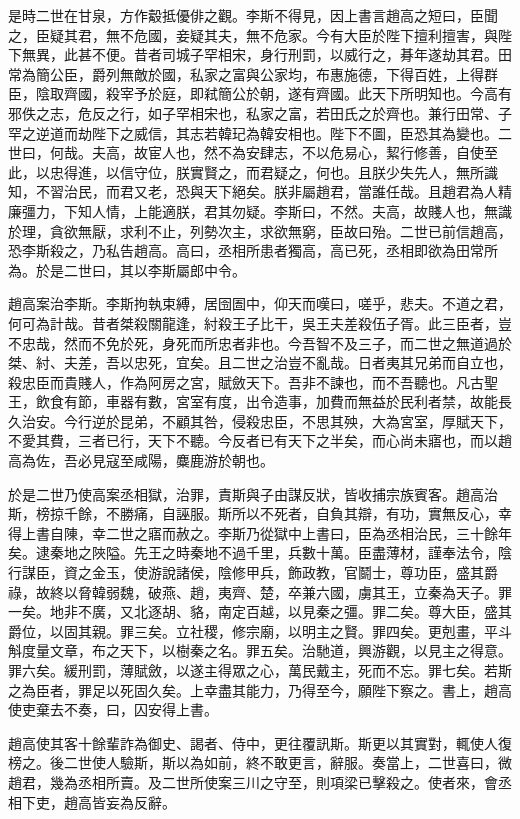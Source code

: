 是時二世在甘泉，方作觳抵優俳之觀。李斯不得見，因上書言趙高之短曰，臣聞之，臣疑其君，無不危國，妾疑其夫，無不危家。今有大臣於陛下擅利擅害，與陛下無異，此甚不便。昔者司城子罕相宋，身行刑罰，以威行之，朞年遂劫其君。田常為簡公臣，爵列無敵於國，私家之富與公家均，布惠施德，下得百姓，上得群臣，陰取齊國，殺宰予於庭，即弒簡公於朝，遂有齊國。此天下所明知也。今高有邪佚之志，危反之行，如子罕相宋也，私家之富，若田氏之於齊也。兼行田常、子罕之逆道而劫陛下之威信，其志若韓玘為韓安相也。陛下不圖，臣恐其為變也。二世曰，何哉。夫高，故宦人也，然不為安肆志，不以危易心，絜行修善，自使至此，以忠得進，以信守位，朕實賢之，而君疑之，何也。且朕少失先人，無所識知，不習治民，而君又老，恐與天下絕矣。朕非屬趙君，當誰任哉。且趙君為人精廉彊力，下知人情，上能適朕，君其勿疑。李斯曰，不然。夫高，故賤人也，無識於理，貪欲無厭，求利不止，列勢次主，求欲無窮，臣故曰殆。二世已前信趙高，恐李斯殺之，乃私告趙高。高曰，丞相所患者獨高，高已死，丞相即欲為田常所為。於是二世曰，其以李斯屬郎中令。

趙高案治李斯。李斯拘執束縛，居囹圄中，仰天而嘆曰，嗟乎，悲夫。不道之君，何可為計哉。昔者桀殺關龍逢，紂殺王子比干，吳王夫差殺伍子胥。此三臣者，豈不忠哉，然而不免於死，身死而所忠者非也。今吾智不及三子，而二世之無道過於桀、紂、夫差，吾以忠死，宜矣。且二世之治豈不亂哉。日者夷其兄弟而自立也，殺忠臣而貴賤人，作為阿房之宮，賦斂天下。吾非不諫也，而不吾聽也。凡古聖王，飲食有節，車器有數，宮室有度，出令造事，加費而無益於民利者禁，故能長久治安。今行逆於昆弟，不顧其咎，侵殺忠臣，不思其殃，大為宮室，厚賦天下，不愛其費，三者已行，天下不聽。今反者已有天下之半矣，而心尚未寤也，而以趙高為佐，吾必見寇至咸陽，麋鹿游於朝也。

於是二世乃使高案丞相獄，治罪，責斯與子由謀反狀，皆收捕宗族賓客。趙高治斯，榜掠千餘，不勝痛，自誣服。斯所以不死者，自負其辯，有功，實無反心，幸得上書自陳，幸二世之寤而赦之。李斯乃從獄中上書曰，臣為丞相治民，三十餘年矣。逮秦地之陜隘。先王之時秦地不過千里，兵數十萬。臣盡薄材，謹奉法令，陰行謀臣，資之金玉，使游說諸侯，陰修甲兵，飾政教，官鬬士，尊功臣，盛其爵祿，故終以脅韓弱魏，破燕、趙，夷齊、楚，卒兼六國，虜其王，立秦為天子。罪一矣。地非不廣，又北逐胡、貉，南定百越，以見秦之彊。罪二矣。尊大臣，盛其爵位，以固其親。罪三矣。立社稷，修宗廟，以明主之賢。罪四矣。更剋畫，平斗斛度量文章，布之天下，以樹秦之名。罪五矣。治馳道，興游觀，以見主之得意。罪六矣。緩刑罰，薄賦斂，以遂主得眾之心，萬民戴主，死而不忘。罪七矣。若斯之為臣者，罪足以死固久矣。上幸盡其能力，乃得至今，願陛下察之。書上，趙高使吏棄去不奏，曰，囚安得上書。

趙高使其客十餘輩詐為御史、謁者、侍中，更往覆訊斯。斯更以其實對，輒使人復榜之。後二世使人驗斯，斯以為如前，終不敢更言，辭服。奏當上，二世喜曰，微趙君，幾為丞相所賣。及二世所使案三川之守至，則項梁已擊殺之。使者來，會丞相下吏，趙高皆妄為反辭。

